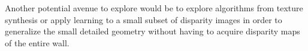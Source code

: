 \documentclass[a4paper,twoside]{article}
\begin{document}

Another potential avenue to explore would be to explore algorithms from texture synthesis or apply learning to a small subset of disparity images in order to generalize the small detailed geometry without having to acquire disparity maps of the entire wall.




\end{document}
